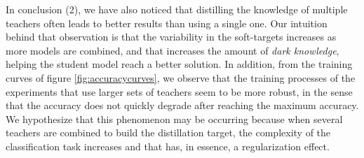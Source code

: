 \documentclass{elsarticle}
\begin{document}
	In conclusion (2), we have also noticed that distilling the knowledge of multiple teachers often leads to better results than using a single one.  Our intuition behind that observation is that the variability in the soft-targets increases as more models are combined, and that increases the amount of \textit{dark knowledge}, helping the student model reach a better solution. In addition, from the training curves of figure \ref{fig:accuracycurves}, we observe that the training processes of the experiments that use larger sets of teachers seem to be more robust, in the sense that the accuracy does not quickly degrade after reaching the maximum accuracy. We hypothesize that this phenomenon may be occurring because when several teachers are combined to build the distillation target, the complexity of the classification task increases and that has, in essence, a regularization effect.
	
\end{document}
